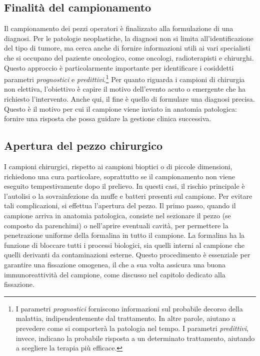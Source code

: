 \subsection{Finalità del campionamento}
Il campionamento dei pezzi operatori è finalizzato alla formulazione di una diagnosi. Per le patologie neoplastiche, la diagnosi non si limita all'identificazione del tipo di tumore, ma cerca anche di fornire informazioni utili ai vari specialisti che si occupano del paziente oncologico, come oncologi, radioterapisti e chirurghi. Questo approccio è particolarmente importante per identificare i cosiddetti parametri \textit{prognostici} e \textit{predittivi}.\footnote{I parametri \textit{prognostici} forniscono informazioni sul probabile decorso della malattia, indipendentemente dal trattamento. In altre parole, aiutano a prevedere come si comporterà la patologia nel tempo. I parametri \textit{predittivi}, invece, indicano la probabile risposta a un determinato trattamento, aiutando a scegliere la terapia più efficace.} Per quanto riguarda i campioni di chirurgia non elettiva, l'obiettivo è capire il motivo dell'evento acuto o emergente che ha richiesto l'intervento. Anche qui, il fine è quello di formulare una diagnosi precisa. Questo è il motivo per cui il campione viene inviato in anatomia patologica: fornire una risposta che possa guidare la gestione clinica successiva.

\subsection{Apertura del pezzo chirurgico}
I campioni chirurgici, rispetto ai campioni bioptici o di piccole dimensioni, richiedono una cura particolare, soprattutto se il campionamento non viene eseguito tempestivamente dopo il prelievo. In questi casi, il rischio principale è l’autolisi o la sovrainfezione da muffe e batteri presenti sul campione. Per evitare tali complicazioni, si effettua l'apertura del pezzo. Il primo passo, quando il campione arriva in anatomia patologica, consiste nel sezionare il pezzo (se composto da parenchimi) o nell’aprire eventuali cavità, per permettere la penetrazione uniforme della formalina in tutto il campione. La formalina ha la funzione di bloccare tutti i processi biologici, sia quelli interni al campione che quelli derivanti da contaminazioni esterne. Questo procedimento è essenziale per garantire una fissazione omogenea, il che a sua volta assicura una buona immunoreattività del campione, come discusso nel capitolo dedicato alla fissazione.

